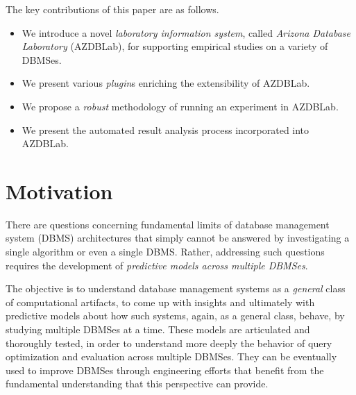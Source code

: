 \documentclass[conference]{IEEEtran}
\begin{document}
The key contributions of this paper are as follows.
\begin{itemize}
\item We introduce a novel {\em laboratory information system}, called {\em Arizona Database Laboratory} ({\sc AZDBLab}), 
for supporting empirical studies on a variety of DBMSes. 

\item We present various {\em plugin}s enriching the extensibility of {\sc AZDBLab}. 

\item We propose a {\em robust} methodology of running an experiment in {\sc AZDBLab}. 

\item We present the automated result analysis process incorporated into {\sc AZDBLab}. 

\end{itemize}

\section{Motivation}\label{sec:motivation} 
There are questions concerning fundamental limits of database management system (DBMS) 
architectures that simply cannot be answered by investigating a single algorithm or even a single DBMS. 
Rather, addressing such questions requires the development of {\em predictive models across multiple DBMSes}. 

The objective is to understand database management systems as a {\em general} class of computational artifacts, 
to come up with insights and ultimately with predictive models about how such systems, again, as a 
general class, behave, by studying multiple DBMSes at a time. 
These models are articulated and thoroughly tested, in order to 
understand more deeply the behavior of query optimization and evaluation across multiple DBMSes. 
They can be eventually used to improve DBMSes through engineering efforts 
that benefit from the fundamental understanding that this perspective can provide. 
\end{document}
